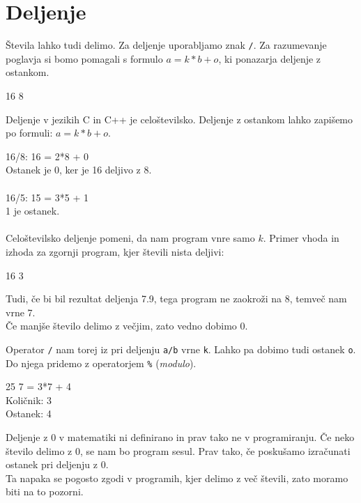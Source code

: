 \pagebreak
\section{Deljenje}
Števila lahko tudi delimo. Za deljenje uporabljamo znak \verb+/+.
Za razumevanje poglavja si bomo pomagali s formulo $a = k*b + o$, ki ponazarja deljenje z ostankom.

\begin{examples}


\begin{inout}
16 8
\end{inout}

\end{examples}

\begin{errors}
Deljenje v jezikih C in C++ je celoštevilsko. Deljenje z ostankom lahko zapišemo po formuli: $a = k*b + o$.

16/8: 16 = 2*8 + 0 \\
Ostanek je 0, ker je 16 deljivo z 8. \\\\

16/5: 15 = 3*5 + 1 \\
1 je ostanek. \\\\

Celoštevilsko deljenje pomeni, da nam program vnre samo $k$. Primer vhoda in izhoda za zgornji program, kjer števili nista deljivi:

\begin{inout}
16 3
\end{inout}

Tudi, če bi bil rezultat deljenja 7.9, tega program ne zaokroži na 8, temveč nam vrne 7. \\
Če manjše število delimo z večjim, zato vedno dobimo 0.

\end{errors}

\pagebreak
Operator \verb+/+ nam torej iz pri deljenju \verb+a/b+ vrne \verb+k+. Lahko pa dobimo tudi ostanek \verb+o+. Do njega pridemo z operatorjem \verb+%+ (\emph{modulo}).

\begin{examples}


\begin{inout}
25 7
 = 3*7 + 4 \\
Količnik: 3 \\
Ostanek: 4
\end{inout}

\end{examples}

\begin{errors}
Deljenje z 0 v matematiki ni definirano in prav tako ne v programiranju. Če neko število delimo z 0, se nam bo program sesul. Prav tako, če poskušamo izračunati ostanek pri deljenju z 0. \\
Ta napaka se pogosto zgodi v programih, kjer delimo z več števili, zato moramo biti na to pozorni.
\end{errors}
